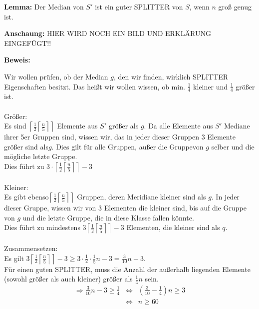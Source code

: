 \begin{description}
\begin{description}

\item{\bfseries Lemma:} Der Median von $S'$ ist ein guter SPLITTER von $S$, wenn $n$ groß genug ist.

\item{\bfseries Anschaung:} HIER WIRD NOCH EIN BILD UND ERKLÄRUNG EINGEFÜGT!!

\item{\bfseries Beweis:}

Wir wollen prüfen, ob der Median $g$, den wir finden, wirklich SPLITTER Eigenschaften besitzt. Das heißt wir wollen wissen, ob min. $\frac{1}{4}$ kleiner und $\frac{1}{4}$ größer ist.\\
\vspace{\baselineskip}\\
Größer:\\
Es sind $\left\lceil \frac{1}{2} \left\lceil \frac{n}{5} \right\rceil \right\rceil$ Elemente aus $S'$ größer als $g$. Da alle Elemente aus $S'$ Mediane ihrer 5er Gruppen sind, wissen wir, das in jeder dieser Gruppen 3 Elemente größer sind als$g$. Dies gilt für alle Gruppen, außer die Gruppevon $g$ selber und die mögliche letzte Gruppe.\\
Dies führt zu $3 \cdot \left\lceil \frac{1}{2} \left\lceil \frac{n}{5} \right\rceil \right\rceil -3$\\
\vspace{\baselineskip}\\
Kleiner:\\
Es gibt ebenso$ \left\lceil \frac{1}{2} \left\lceil \frac{n}{5} \right\rceil \right \rceil$ Gruppen, deren Meridiane kleiner sind als $g$. In jeder dieser Gruppe, wissen wir von 3 Elementen die kleiner sind, bis auf die Gruppe von $g$ und die letzte Gruppe, die in diese Klasse fallen könnte.\\
Dies führt zu mindestens $3 \left\lceil \frac{1}{2} \left\lceil \frac{n}{5} \right\rceil \right\rceil -3$ Elementen, die kleiner sind als $q$.\\
\vspace{\baselineskip}\\
Zusammensetzen:\\
Es gilt $3 \left\lceil \frac{1}{2} \left\lceil \frac{n}{5} \right\rceil \right\rceil -3 \geq 3 \cdot \frac{1}{2} \cdot \frac{1}{5} n - 3 = \frac{3}{10}n -3$.\\
Für einen guten SPLITTER, muss die Anzahl der außerhalb liegenden Elemente (sowohl größer als auch kleiner) größer als $\frac{1}{4} n$ sein.\\
$$
\begin{array}{rcl}
\Rightarrow \frac{3}{10}n - 3 \geq \frac{1}{4} &\Leftrightarrow& \left( \frac{3}{10} -  \frac{1}{4} \right)n \geq 3\\
&\Leftrightarrow& n\geq 60
\end{array}
$$


\end{description}
\end{description}
